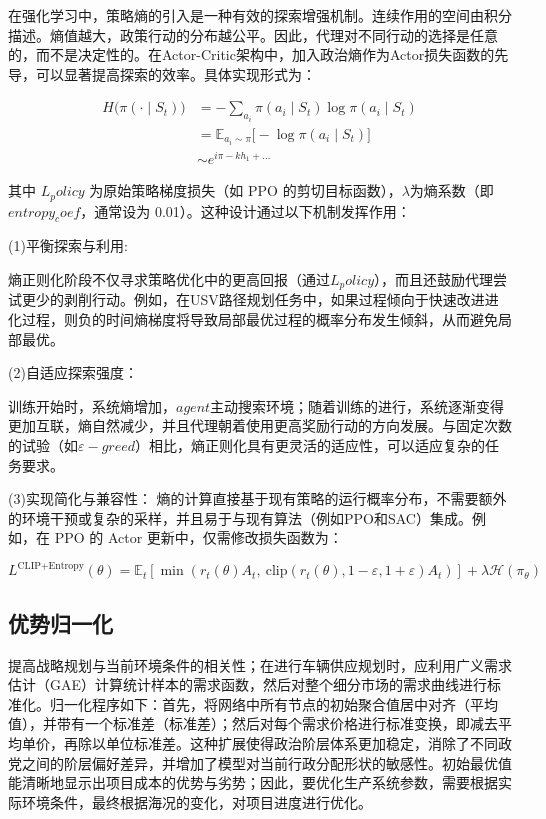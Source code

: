 在强化学习中，策略熵的引入是一种有效的探索增强机制。连续作用的空间由积分描述。熵值越大，政策行动的分布越公平。因此，代理对不同行动的选择是任意的，而不是决定性的。在Actor-Critic架构中，加入政治熵作为Actor损失函数的先导，可以显著提高探索的效率。具体实现形式为：

\begin{align}
	H\big(\pi(\cdot \mid S_t)\big) &= -\sum_{a_i} \pi(a_i \mid S_t) \log \pi(a_i \mid S_t) \\
	&= \mathbb{E}_{a_i \sim \pi} \Big[ -\log \pi(a_i \mid S_t) \Big] \\
	&\sim e^{i\pi - k h_1 + \dots}
\end{align}

其中 \(L_policy\) 为原始策略梯度损失（如 PPO 的剪切目标函数），\(λ\)为熵系数（即 \(entropy_coef\)，通常设为 0.01）。这种设计通过以下机制发挥作用：

(1)平衡探索与利用:

熵正则化阶段不仅寻求策略优化中的更高回报（通过\(L_policy\)），而且还鼓励代理尝试更少的剥削行动。例如，在USV路径规划任务中，如果过程倾向于快速改进进化过程，则负的时间熵梯度将导致局部最优过程的概率分布发生倾斜，从而避免局部最优。

(2)自适应探索强度：

训练开始时，系统熵增加，\(agent\)主动搜索环境；随着训练的进行，系统逐渐变得更加互联，熵自然减少，并且代理朝着使用更高奖励行动的方向发展。与固定次数的试验（如\(ε-greed\)）相比，熵正则化具有更灵活的适应性，可以适应复杂的任务要求。

(3)实现简化与兼容性：
熵的计算直接基于现有策略的运行概率分布，不需要额外的环境干预或复杂的采样，并且易于与现有算法（例如PPO和SAC）集成。例如，在 PPO 的 Actor 更新中，仅需修改损失函数为：

\begin{equation}
	L^{\text{CLIP+Entropy}}(\theta) = \mathbb{E}_t \left[ \min\left( r_t(\theta) A_t, \ \text{clip}\left( r_t(\theta), 1-\varepsilon, 1+\varepsilon \right) A_t \right) \right] + \lambda \mathcal{H}(\pi_\theta)
\end{equation}

\subsection{优势归一化}

提高战略规划与当前环境条件的相关性；在进行车辆供应规划时，应利用广义需求估计（GAE）计算统计样本的需求函数，然后对整个细分市场的需求曲线进行标准化。归一化程序如下：首先，将网络中所有节点的初始聚合值居中对齐（平均值），并带有一个标准差（标准差）；然后对每个需求价格进行标准变换，即减去平均单价，再除以单位标准差。这种扩展使得政治阶层体系更加稳定，消除了不同政党之间的阶层偏好差异，并增加了模型对当前行政分配形状的敏感性。初始最优值能清晰地显示出项目成本的优势与劣势；因此，要优化生产系统参数，需要根据实际环境条件，最终根据海况的变化，对项目进度进行优化。

